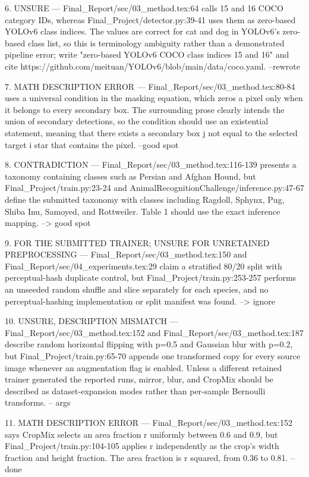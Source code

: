 6. UNSURE — Final_Report/sec/03_method.tex:64 calls 15 and 16 COCO category IDs, whereas Final_Project/detector.py:39-41 uses them as zero-based YOLOv6 class indices. The values are correct for cat and dog in YOLOv6's zero-based class list, so this is terminology ambiguity rather than a demonstrated pipeline error; write "zero-based YOLOv6 COCO class indices 15 and 16" and cite https://github.com/meituan/YOLOv6/blob/main/data/coco.yaml.
--rewrote

7. MATH DESCRIPTION ERROR — Final_Report/sec/03_method.tex:80-84 uses a universal condition in the masking equation, which zeros a pixel only when it belongs to every secondary box. The surrounding prose clearly intends the union of secondary detections, so the condition should use an existential statement, meaning that there exists a secondary box j not equal to the selected target i star that contains the pixel.
--good spot

8. CONTRADICTION — Final_Report/sec/03_method.tex:116-139 presents a taxonomy containing classes such as Persian and Afghan Hound, but Final_Project/train.py:23-24 and AnimalRecognitionChallenge/inference.py:47-67 define the submitted taxonomy with classes including Ragdoll, Sphynx, Pug, Shiba Inu, Samoyed, and Rottweiler. Table 1 should use the exact inference mapping.
--> good spot

9. FOR THE SUBMITTED TRAINER; UNSURE FOR UNRETAINED PREPROCESSING — Final_Report/sec/03_method.tex:150 and Final_Report/sec/04_experiments.tex:29 claim a stratified 80/20 split with perceptual-hash duplicate control, but Final_Project/train.py:253-257 performs an unseeded random shuffle and slice separately for each species, and no perceptual-hashing implementation or split manifest was found. 
--> ignore

10. UNSURE, DESCRIPTION MISMATCH — Final_Report/sec/03_method.tex:152 and Final_Report/sec/03_method.tex:187 describe random horizontal flipping with p=0.5 and Gaussian blur with p=0.2, but Final_Project/train.py:65-70 appends one transformed copy for every source image whenever an augmentation flag is enabled. Unless a different retained trainer generated the reported runs, mirror, blur, and CropMix should be described as dataset-expansion modes rather than per-sample Bernoulli transforms.
-- args

11. MATH DESCRIPTION ERROR — Final_Report/sec/03_method.tex:152 says CropMix selects an area fraction r uniformly between 0.6 and 0.9, but Final_Project/train.py:104-105 applies r independently as the crop's width fraction and height fraction. The area fraction is r squared, from 0.36 to 0.81.
--done

